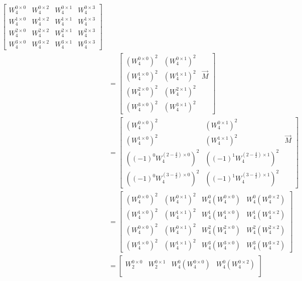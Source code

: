 \documentclass[journal,12pt,twocolumn]{IEEEtran}
\renewcommand\thesection{\arabic{section}}
\begin{document}
\begin{enumerate}[label=\arabic*.,ref=\thesection.\theenumi]
\begin{align}
\begin{bmatrix}
		W_4^{0\times0}&W_4^{0\times2}&W_4^{0\times1}&W_4^{0\times3}\\
		W_4^{1\times0}&W_4^{1\times2}&W_4^{1\times1}&W_4^{1\times3}\\
		W_4^{2\times0}&W_4^{2\times2}&W_4^{2\times1}&W_4^{2\times3}\\
		W_4^{3\times0}&W_4^{3\times2}&W_4^{3\times1}&W_4^{3\times3}
	\end{bmatrix}\\
&=\begin{bmatrix}
	\left(W_4^{0\times0}\right)^2&\left(W_4^{0\times1}\right)^2 \\
	\left(W_4^{1\times0}\right)^2&\left(W_4^{1\times1}\right)^2&\vec{M}\\
	\left(W_4^{2\times0}\right)^2&\left(W_4^{2\times1}\right)^2\\
	\left(W_4^{3\times0}\right)^2&\left(W_4^{3\times1}\right)^2
\end{bmatrix}\\
&=\begin{bmatrix}
	\left(W_4^{0\times0}\right)^2&\left(W_4^{0\times1}\right)^2\\
	\left(W_4^{1\times0}\right)^2&\left(W_4^{1\times1}\right)^2&\vec{M}\\
	\left((-1)^0W_4^{\left(2-\frac{4}{2}\right)\times0}\right)^2&\left((-1)^1W_4^{\left(2-\frac{4}{2}\right)\times1}\right)^2\\
	\left((-1)^0W_4^{\left(3-\frac{4}{2}\right)\times0}\right)^2&\left((-1)^1W_4^{\left(3-\frac{4}{2}\right)\times1}\right)^2
\end{bmatrix}\\
&=\begin{bmatrix}
	\left(W_4^{0\times0}\right)^2&\left(W_4^{0\times1}\right)^2&W_4^0\left(W_4^{0\times0}\right)&W_4^0\left(W_4^{0\times2}\right)\\
	\left(W_4^{1\times0}\right)^2&\left(W_4^{1\times1}\right)^2&W_4^1\left(W_4^{1\times0}\right)&W_4^1\left(W_4^{1\times2}\right)\\
	\left(W_4^{0\times0}\right)^2&\left(W_4^{0\times1}\right)^2&W_4^2\left(W_4^{2\times0}\right)&W_4^2\left(W_4^{2\times2}\right)\\
	\left(W_4^{1\times0}\right)^2&\left(W_4^{1\times1}\right)^2&W_4^3\left(W_4^{3\times0}\right)&W_4^3\left(W_4^{3\times2}\right)
\end{bmatrix}\\
&=\begin{bmatrix}
	W_2^{0\times0}&W_2^{0\times1}&W_4^0\left(W_4^{0\times0}\right)&W_4^0\left(W_4^{0\times2}\right)\\

\end{bmatrix}
\end{align}
\end{enumerate}
\end{document}
